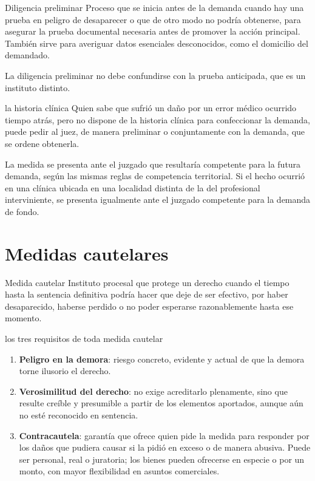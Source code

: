 \documentclass[12pt,oneside]{book}
\begin{document}
\begin{definicion}{Diligencia preliminar}
Proceso que se inicia antes de la demanda cuando hay una prueba en peligro de desaparecer o que de otro modo no podría obtenerse, para asegurar la prueba documental necesaria antes de promover la acción principal. También sirve para averiguar datos esenciales desconocidos, como el domicilio del demandado.
\end{definicion}

\begin{advertencia}
La diligencia preliminar no debe confundirse con la prueba anticipada, que es un instituto distinto.
\end{advertencia}

\begin{ejemplo}{la historia clínica}
Quien sabe que sufrió un daño por un error médico ocurrido tiempo atrás, pero no dispone de la historia clínica para confeccionar la demanda, puede pedir al juez, de manera preliminar o conjuntamente con la demanda, que se ordene obtenerla.
\end{ejemplo}

La medida se presenta ante el juzgado que resultaría competente para la futura demanda, según las mismas reglas de competencia territorial. Si el hecho ocurrió en una clínica ubicada en una localidad distinta de la del profesional interviniente, se presenta igualmente ante el juzgado competente para la demanda de fondo.

\section{Medidas cautelares}\label{sec:cautelares}

\begin{definicion}{Medida cautelar}
Instituto procesal que protege un derecho cuando el tiempo hasta la sentencia definitiva podría hacer que deje de ser efectivo, por haber desaparecido, haberse perdido o no poder esperarse razonablemente hasta ese momento.
\end{definicion}

\begin{regla}{los tres requisitos de toda medida cautelar}
\begin{enumerate}
\item \textbf{Peligro en la demora}: riesgo concreto, evidente y actual de que la demora torne ilusorio el derecho.
\item \textbf{Verosimilitud del derecho}: no exige acreditarlo plenamente, sino que resulte creíble y presumible a partir de los elementos aportados, aunque aún no esté reconocido en sentencia.
\item \textbf{Contracautela}: garantía que ofrece quien pide la medida para responder por los daños que pudiera causar si la pidió en exceso o de manera abusiva. Puede ser personal, real o juratoria; los bienes pueden ofrecerse en especie o por un monto, con mayor flexibilidad en asuntos comerciales.
\end{enumerate}
\end{regla}
\end{document}
